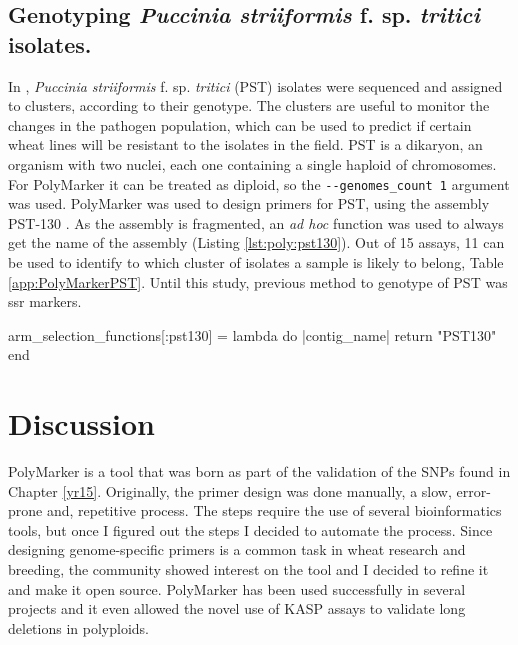 \subsection{Genotyping \textit{Puccinia 
striiformis} f. sp. \textit{tritici} isolates.}
In \cite{Hubbard2015}, \textit{Puccinia striiformis} f. sp. \textit{tritici} (PST) isolates were sequenced and assigned to clusters, according to their genotype.
The clusters are useful to monitor the changes in the pathogen population, which can be used to predict if certain wheat lines will be resistant to the isolates in the field. 
PST is a dikaryon, an organism with two nuclei, each one containing a single haploid of chromosomes.
For PolyMarker it can be treated as diploid, so the \verb|--genomes_count 1| argument was used.
PolyMarker was used to design primers for PST, using the assembly PST-130 \citet{Cantu2011}.
As the assembly is fragmented, an \textit{ad hoc} function was used to always get the name of the assembly (Listing \ref{lst:poly:pst130}). 
Out of 15 assays, 11 can be used to identify to which cluster of isolates a sample is likely to belong, Table \ref{app:PolyMarkerPST}.
Until this study, previous method to genotype of PST was \acrshort{ssr} markers.

\begin{code}[language=Ruby,caption=Function that always returns PST130 as chromosome, label=lst:poly:pst130]
arm_selection_functions[:pst130] = lambda do |contig_name|       
  return "PST130"
end
\end{code}



\section{Discussion}

PolyMarker is a tool that was born as part of the validation of the SNPs found in Chapter \ref{yr15}. 
Originally, the primer design was done manually, a slow, error-prone and, repetitive process. 
The steps require the use of several bioinformatics tools, but once I figured out the steps I decided to automate the process. 
Since designing genome-specific primers is a common task in wheat research and breeding, the community showed interest on the tool and I decided to refine it and make it open source. 
PolyMarker has been used successfully in several projects and it even allowed the novel use of KASP assays to validate long deletions in polyploids. 
 

